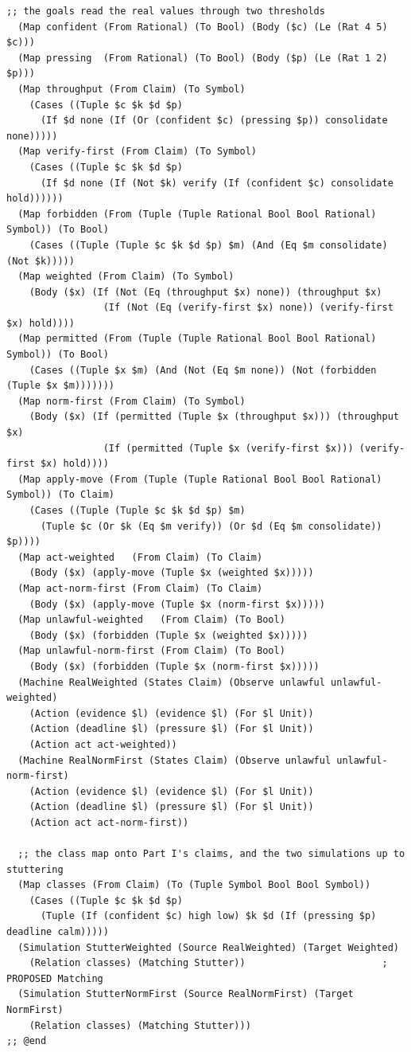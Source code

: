 \documentclass[11pt]{article}
\theoremstyle{definition}
\theoremstyle{plain}
\begin{document}
\begin{lstlisting}[style=mettafull]
  ;; the goals read the real values through two thresholds
  (Map confident (From Rational) (To Bool) (Body ($c) (Le (Rat 4 5) $c)))
  (Map pressing  (From Rational) (To Bool) (Body ($p) (Le (Rat 1 2) $p)))
  (Map throughput (From Claim) (To Symbol)
    (Cases ((Tuple $c $k $d $p)
      (If $d none (If (Or (confident $c) (pressing $p)) consolidate none)))))
  (Map verify-first (From Claim) (To Symbol)
    (Cases ((Tuple $c $k $d $p)
      (If $d none (If (Not $k) verify (If (confident $c) consolidate hold))))))
  (Map forbidden (From (Tuple (Tuple Rational Bool Bool Rational) Symbol)) (To Bool)
    (Cases ((Tuple (Tuple $c $k $d $p) $m) (And (Eq $m consolidate) (Not $k)))))
  (Map weighted (From Claim) (To Symbol)
    (Body ($x) (If (Not (Eq (throughput $x) none)) (throughput $x)
                 (If (Not (Eq (verify-first $x) none)) (verify-first $x) hold))))
  (Map permitted (From (Tuple (Tuple Rational Bool Bool Rational) Symbol)) (To Bool)
    (Cases ((Tuple $x $m) (And (Not (Eq $m none)) (Not (forbidden (Tuple $x $m)))))))
  (Map norm-first (From Claim) (To Symbol)
    (Body ($x) (If (permitted (Tuple $x (throughput $x))) (throughput $x)
                 (If (permitted (Tuple $x (verify-first $x))) (verify-first $x) hold))))
  (Map apply-move (From (Tuple (Tuple Rational Bool Bool Rational) Symbol)) (To Claim)
    (Cases ((Tuple (Tuple $c $k $d $p) $m)
      (Tuple $c (Or $k (Eq $m verify)) (Or $d (Eq $m consolidate)) $p))))
  (Map act-weighted   (From Claim) (To Claim)
    (Body ($x) (apply-move (Tuple $x (weighted $x)))))
  (Map act-norm-first (From Claim) (To Claim)
    (Body ($x) (apply-move (Tuple $x (norm-first $x)))))
  (Map unlawful-weighted   (From Claim) (To Bool)
    (Body ($x) (forbidden (Tuple $x (weighted $x)))))
  (Map unlawful-norm-first (From Claim) (To Bool)
    (Body ($x) (forbidden (Tuple $x (norm-first $x)))))
  (Machine RealWeighted (States Claim) (Observe unlawful unlawful-weighted)
    (Action (evidence $l) (evidence $l) (For $l Unit))
    (Action (deadline $l) (pressure $l) (For $l Unit))
    (Action act act-weighted))
  (Machine RealNormFirst (States Claim) (Observe unlawful unlawful-norm-first)
    (Action (evidence $l) (evidence $l) (For $l Unit))
    (Action (deadline $l) (pressure $l) (For $l Unit))
    (Action act act-norm-first))

  ;; the class map onto Part I's claims, and the two simulations up to stuttering
  (Map classes (From Claim) (To (Tuple Symbol Bool Bool Symbol))
    (Cases ((Tuple $c $k $d $p)
      (Tuple (If (confident $c) high low) $k $d (If (pressing $p) deadline calm)))))
  (Simulation StutterWeighted (Source RealWeighted) (Target Weighted)
    (Relation classes) (Matching Stutter))                        ; PROPOSED Matching
  (Simulation StutterNormFirst (Source RealNormFirst) (Target NormFirst)
    (Relation classes) (Matching Stutter)))
;; @end


\end{lstlisting}
\end{document}
